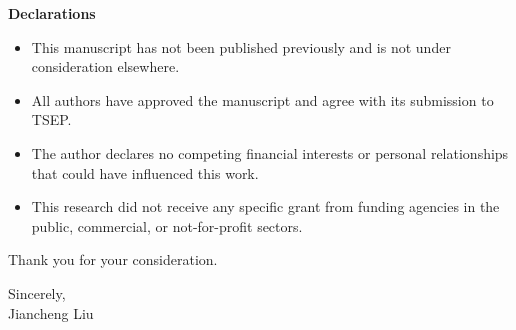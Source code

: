 \documentclass{article}
\begin{document}
\vspace{0.5cm}

\noindent \textbf{Declarations}
\begin{itemize}
  \item This manuscript has not been published previously and is not under consideration elsewhere.
  \item All authors have approved the manuscript and agree with its submission to TSEP.
  \item The author declares no competing financial interests or personal relationships that could have influenced this work.
  \item This research did not receive any specific grant from funding agencies in the public, commercial, or not-for-profit sectors.
\end{itemize}

\vspace{0.5cm}

\noindent Thank you for your consideration.

\vspace{0.5cm}

\noindent Sincerely,\\
Jiancheng Liu
\end{document}
